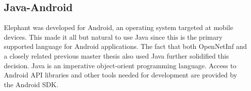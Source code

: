 \subsection{Java-Android}

Elephant was developed for Android, an operating system targeted at mobile devices. This made it all but natural to use Java since this is the primary supported language for Android applications. The fact that both OpenNetInf and a closely related previous master thesis \cite{hugomiguel} also used Java further solidified this decision. Java is an imperative object-orient programming language. Access to Android API libraries and other tools needed for development are provided by the Android SDK.
